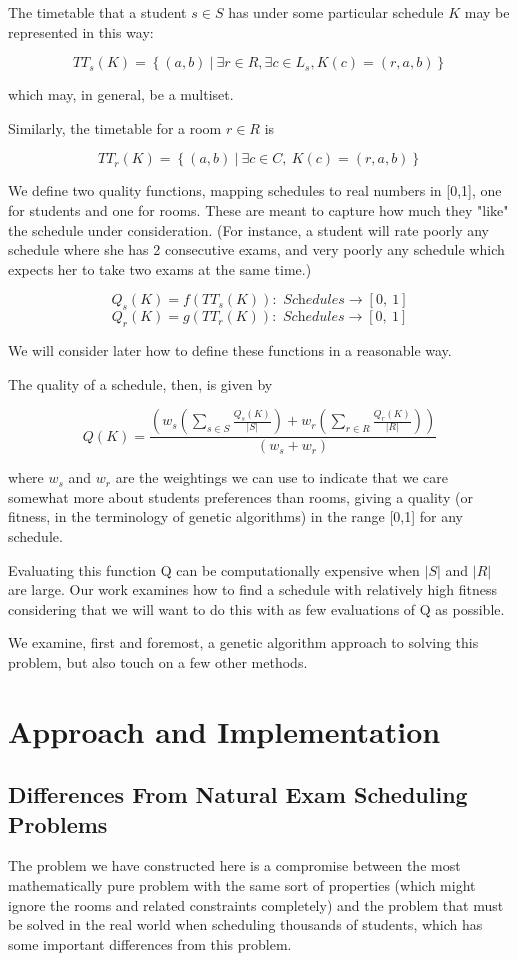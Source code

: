 \documentclass[letterpaper]{article}
\begin{document}
  The timetable that a student $s \in S$ has under some particular schedule 
  $K$ may be represented in this way:
  
  \[ TT_s(K) = \left\{(a, b)\ |\ \exists r \in R, \exists c \in L_s, K(c)=(r, a, b) \right\} \]
  
  which may, in general, be a multiset.
  
  Similarly, the timetable for a room $r \in R$ is
  
  \[ TT_r(K)=\left\{(a, b)\ |\ \exists c\in C,\ K(c)=(r, a, b)\right\} \]
  
  We define two quality functions, mapping schedules to real numbers in [0,1],
  one for students and one for rooms. These are meant to capture how much they
  "like" the schedule under consideration. (For instance, a student will rate
  poorly any schedule where she has 2 consecutive exams, and very poorly any 
  schedule which expects her to take two exams at the same time.)
  
  \[ Q_s(K)=f\left(TT_s(K)\right):\textit{ Schedules}\rightarrow [0,\ 1] \]
  \[ Q_r(K)=g\left(TT_r(K)\right):\textit{ Schedules}\rightarrow [0,\ 1] \]
  
  We will consider later how to define these functions in a reasonable way.

  The quality of a schedule, then, is given by
  
  \[ Q(K)= \frac{\left(w_s\left(\sum_{s \in S}{\frac{Q_s(K)}{|S|}}\right) +
     w_r\left(\sum_{r\in R}{\frac{Q_r(K)}{|R|}} \right)\right)}{(w_s+w_r)} \]
  
  where $w_s$ and $w_r$ are the weightings we can use to indicate that we 
  care somewhat more about students preferences than rooms, giving a quality
  (or fitness, in the terminology of genetic algorithms) in the range [0,1] for
  any schedule.
  
  Evaluating this function Q can be computationally expensive when $|S|$ and $|R|$
  are large. Our work examines how to find a schedule with relatively high fitness
  considering that we will want to do this with as few evaluations of Q as possible.

  We examine, first and foremost, a genetic algorithm approach to solving this problem,
  but also touch on a few other methods.

\section{Approach and Implementation}
  \subsection{Differences From Natural Exam Scheduling Problems}
    The problem we have constructed here is a compromise between the most
    mathematically pure problem with the same sort of properties (which might ignore the
    rooms and related constraints completely) and the problem that must be solved in the
    real world when scheduling thousands of students, which has some important differences
    from this problem.
    
\end{document}
